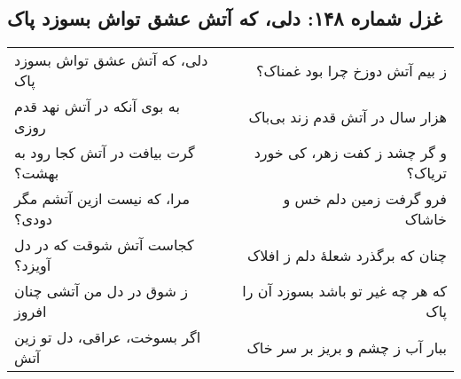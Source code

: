 \begin{center}
\section*{غزل شماره ۱۴۸: دلی، که آتش عشق تواش بسوزد پاک}
\label{sec:148}
\begin{longtable}{l p{0.5cm} r}
دلی، که آتش عشق تواش بسوزد پاک
&&
ز بیم آتش دوزخ چرا بود غمناک؟
\\
به بوی آنکه در آتش نهد قدم روزی
&&
هزار سال در آتش قدم زند بی‌باک
\\
گرت بیافت در آتش کجا رود به بهشت؟
&&
و گر چشد ز کفت زهر، کی خورد تریاک؟
\\
مرا، که نیست ازین آتشم مگر دودی؟
&&
فرو گرفت زمین دلم خس و خاشاک
\\
کجاست آتش شوقت که در دل آویزد؟
&&
چنان که برگذرد شعلهٔ دلم ز افلاک
\\
ز شوق در دل من آتشی چنان افروز
&&
که هر چه غیر تو باشد بسوزد آن را پاک
\\
اگر بسوخت، عراقی، دل تو زین آتش
&&
ببار آب ز چشم و بریز بر سر خاک
\\
\end{longtable}
\end{center}
